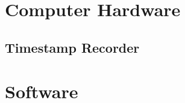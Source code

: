 \documentclass[12pt]{article}
\begin{document}
\section{Computer Hardware}\label{sec:cs-hardware}

\subsection{Timestamp Recorder}\label{sec:ts-rec}

\section{Software}\label{sec:software}
\end{document}
